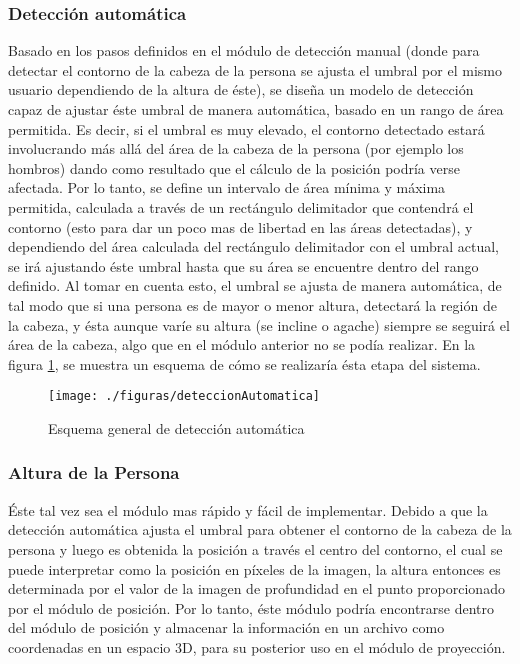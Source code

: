 \documentclass[a4paper,openright,12pt]{report}
\begin{document}
\subsubsection{Detección automática}
Basado en los pasos definidos en el módulo de detección manual (donde para detectar el contorno de la cabeza de la persona se ajusta el umbral por el mismo usuario dependiendo de la altura de éste), se diseña un modelo de detección capaz de ajustar éste umbral de manera automática, basado en un rango de área permitida. Es decir, si el umbral es muy elevado, el contorno detectado estará involucrando más allá del área de la cabeza de la persona (por ejemplo los hombros) dando como resultado que el cálculo de la posición podría verse afectada. Por lo tanto, se define un intervalo de área mínima y máxima permitida, calculada a través de un rectángulo delimitador que contendrá el contorno (esto para dar un poco mas de libertad en las áreas detectadas), y dependiendo del área calculada del rectángulo delimitador con el umbral actual, se irá ajustando éste umbral hasta que su área se encuentre dentro del rango definido. Al tomar en cuenta esto, el umbral se ajusta de manera automática, de tal modo que si una persona es de mayor o menor altura, detectará la región de la cabeza, y ésta aunque varíe su altura (se incline o agache) siempre se seguirá el área de la cabeza, algo que en el módulo anterior no se podía realizar. En la figura \ref{fig:deteccAutomatica}, se muestra un esquema de cómo se realizaría ésta etapa del sistema.
\begin{figure}[th]
	\centering
	\texttt{[image: ./figuras/deteccionAutomatica]}
	\caption{Esquema general de detección automática} \label{fig:deteccAutomatica}
\end{figure}
\subsubsection{Altura de la Persona}
Éste tal vez sea el módulo mas rápido y fácil de implementar. Debido a que la detección automática ajusta el umbral para obtener el contorno de la cabeza de la persona y luego es obtenida la posición a través el centro del contorno, el cual se puede interpretar como la posición en píxeles de la imagen, la altura entonces es determinada por el valor de la imagen de profundidad en el punto proporcionado por el módulo de posición. Por lo tanto, éste módulo podría encontrarse dentro del módulo de posición y almacenar la información en un archivo como coordenadas en un espacio 3D, para su posterior uso en el módulo de proyección.
\end{document}
